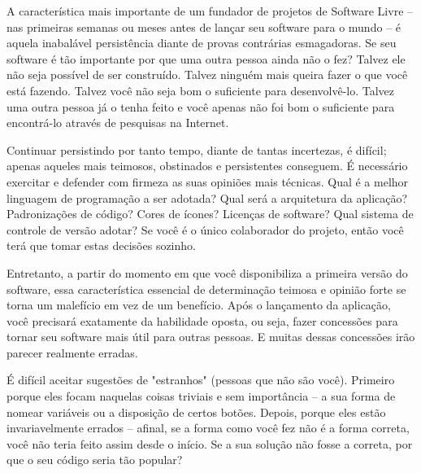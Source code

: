 

\noindent{}A característica mais importante de um fundador de projetos de Software Livre -- 
nas primeiras semanas ou meses antes de lançar seu software para o mundo -- é aquela 
inabalável persistência diante de provas contrárias esmagadoras. Se seu software é tão
importante por que uma outra pessoa ainda não o fez? Talvez ele não seja possível de ser construído. 
Talvez ninguém mais queira fazer o que você está fazendo. Talvez você não seja bom o suficiente
para desenvolvê-lo. Talvez uma outra pessoa já o tenha feito e você apenas não foi bom o
suficiente para encontrá-lo através de pesquisas na Internet.

Continuar persistindo por tanto tempo, diante de tantas incertezas, é difícil; apenas aqueles mais teimosos,
obstinados e persistentes conseguem. É necessário exercitar e defender com firmeza as suas opiniões 
mais técnicas. Qual é a melhor linguagem de programação a ser adotada?
Qual será a arquitetura da aplicação? Padronizações de código? Cores de ícones? Licenças de software? Qual sistema de
controle de versão adotar? Se você é o único colaborador do projeto, então você
terá que tomar estas decisões sozinho.

Entretanto, a partir do momento em que você disponibiliza a primeira versão do software, essa característica essencial de 
determinação teimosa e opinião forte se torna um malefício em vez de um benefício. Após o 
lançamento da aplicação, você precisará exatamente da habilidade oposta, ou seja, fazer concessões para
tornar seu software mais útil para outras pessoas. E muitas dessas concessões irão parecer
realmente erradas.

É difícil aceitar sugestões de "estranhos" (pessoas que não são você). 
Primeiro porque eles focam naquelas coisas triviais e sem importância -- a sua forma
de nomear variáveis ou a disposição de certos botões. Depois, porque eles
estão invariavelmente errados -- afinal, se a forma como você fez não é a forma correta,
você não teria feito assim desde o início. Se a sua solução não fosse a correta, por que
o seu código seria tão popular?

